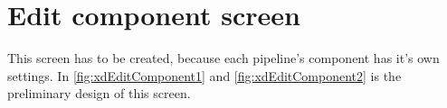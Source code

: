 
\section{Edit component screen}
This screen has to be created, because each pipeline's component has it's own settings.
In \autoref{fig:xdEditComponent1} and \autoref{fig:xdEditComponent2} is the preliminary design of this screen.

